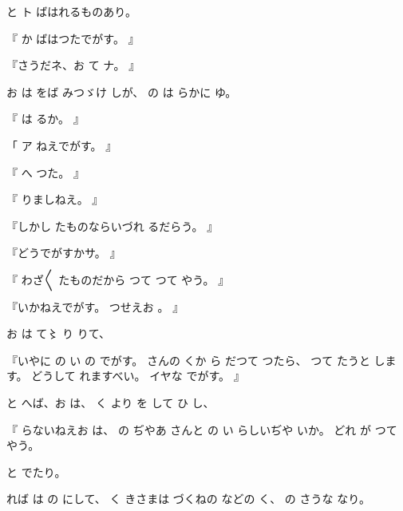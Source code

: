 と
ト
ばはれるものあり。

『
か
ばはつたでがす。
』

『さうだネ、お
て
ナ。
』

お
は
をば
みつゞけ
しが、
の
は
らかに
ゆ。

『
は
るか。
』

「
ア
ねえでがす。
』

『
へ
つた。
』

『
りましねえ。
』

『しかし
たものならいづれ
るだらう。
』

『どうでがすかサ。
』

『
わざ〳〵
たものだから
つて
つて
やう。
』

『いかねえでがす。
つせえお
。
』

お
は
て〻
り
りて、

『いやに
の
い
の
でがす。
さんの
くか
ら
だつて
つたら、
つて
たうと
します。
どうして
れますべい。
イヤな
でがす。
』

と
へば、お
は、
く
より
を
して
ひ
し、

『
らないねえお
は、
の
ぢやあ
さんと
の
い
らしいぢや
いか。
どれ
が
つて
やう。

と
でたり。

れば
は
の
にして、
く
きさまは
づくねの
などの
く、
の
さうな
なり。

